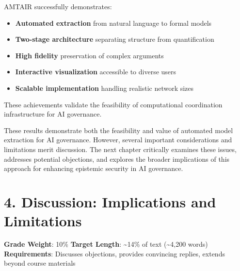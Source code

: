 \documentclass[
  11pt,
  letterpaper,
]{book}
\providecommand{\tightlist}{%
  \setlength{\itemsep}{0pt}\setlength{\parskip}{0pt}}
\begin{document}

AMTAIR successfully demonstrates:

\begin{itemize}
\tightlist
\item
  \textbf{Automated extraction} from natural language to formal models
\item
  \textbf{Two-stage architecture} separating structure from
  quantification
\item
  \textbf{High fidelity} preservation of complex arguments
\item
  \textbf{Interactive visualization} accessible to diverse users
\item
  \textbf{Scalable implementation} handling realistic network sizes
\end{itemize}

These achievements validate the feasibility of computational
coordination infrastructure for AI governance.

These results demonstrate both the feasibility and value of automated
model extraction for AI governance. However, several important
considerations and limitations merit discussion. The next chapter
critically examines these issues, addresses potential objections, and
explores the broader implications of this approach for enhancing
epistemic security in AI governance.


\chapter*{4. Discussion: Implications and
Limitations}\label{sec-discussion}


\begin{tcolorbox}[enhanced jigsaw, arc=.35mm, titlerule=0mm, breakable, toprule=.15mm, toptitle=1mm, colframe=quarto-callout-note-color-frame, coltitle=black, bottomrule=.15mm, bottomtitle=1mm, opacityback=0, title=\textcolor{quarto-callout-note-color}{\faInfo}\hspace{0.5em}{Chapter Overview}, rightrule=.15mm, leftrule=.75mm, colback=white, colbacktitle=quarto-callout-note-color!10!white, opacitybacktitle=0.6, left=2mm]

\textbf{Grade Weight}: 10\% \textbar{} \textbf{Target Length}:
\textasciitilde14\% of text (\textasciitilde4,200 words)\\
\textbf{Requirements}: Discusses objections, provides convincing
replies, extends beyond course materials

\end{tcolorbox}
\end{document}

